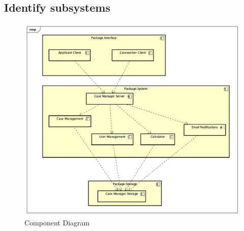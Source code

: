 \newpage
\subsection{Identify subsystems}
\begin{figure}[htb!]
    \centering
    \includegraphics[width=\textwidth]{img/cmp-diagram.png}
    \caption{Component Diagram}
\end{figure}